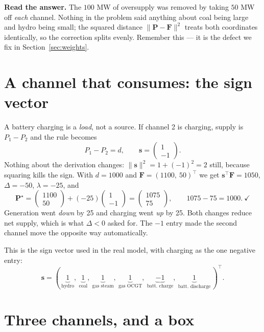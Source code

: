 \documentclass[11pt]{article}
\newcommand{\s}{\mathbf{s}}
\newcommand{\F}{\mathbf{F}}
\newcommand{\Pv}{\mathbf{P}}
\begin{document}
\medskip
\noindent\textbf{Read the answer.} The $100$ MW of oversupply was removed by
taking $50$ MW off \emph{each} channel. Nothing in the problem said anything
about coal being large and hydro being small; the squared distance
$\lVert\Pv-\F\rVert^2$ treats both coordinates identically, so the correction
splits evenly. Remember this --- it is the defect we fix in
Section~\ref{sec:weights}.

\section{A channel that consumes: the sign vector}

A battery charging is a \emph{load}, not a source. If channel 2 is charging,
supply is $P_1 - P_2$ and the rule becomes
\[
  P_1 - P_2 = d, \qquad \s = \begin{pmatrix}1\\-1\end{pmatrix}.
\]
Nothing about the derivation changes: $\lVert\s\rVert^2 = 1 + (-1)^2 = 2$ still,
because squaring kills the sign. With $d=1000$ and
$\F = (1100,\ 50)^{\!\top}$ we get $\s^{\!\top}\F = 1050$, $\Delta = -50$,
$\lambda = -25$, and
\[
  \Pv^\star = \begin{pmatrix}1100\\50\end{pmatrix} + (-25)\begin{pmatrix}1\\-1\end{pmatrix}
            = \begin{pmatrix}1075\\75\end{pmatrix},
  \qquad 1075 - 75 = 1000 .\ \checkmark
\]
Generation went \emph{down} by 25 and charging went \emph{up} by 25. Both
changes reduce net supply, which is what $\Delta<0$ asked for. The $-1$ entry
made the second channel move the opposite way automatically.

This is the sign vector used in the real model, with charging as the one
negative entry:
\[
  \s = (\,\underbrace{1}_{\text{hydro}},\ \underbrace{1}_{\text{coal}},\
        \underbrace{1}_{\text{gas steam}},\ \underbrace{1}_{\text{gas OCGT}},\
        \underbrace{-1}_{\text{batt.\ charge}},\ \underbrace{1}_{\text{batt.\ discharge}}\,)^{\!\top}.
\]

\section{Three channels, and a box}
\label{sec:box}
\end{document}
